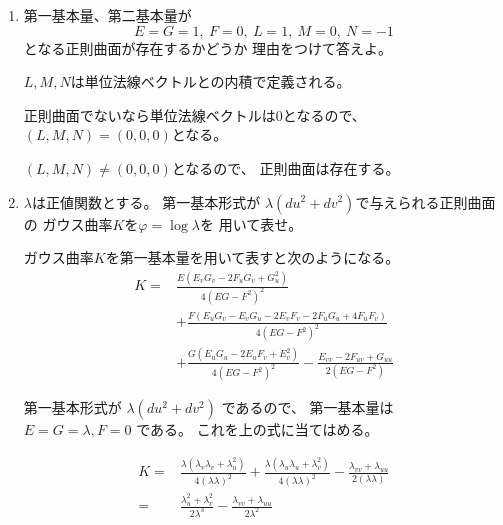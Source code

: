 \documentclass[12pt,b5paper]{ltjsarticle}
\begin{document}
\begin{enumerate}
 \item
      第一基本量、第二基本量が
      \begin{equation}
       E=G=1,\
        F=0,\
        L=1,\
        M=0,\
        N=-1
      \end{equation}
      となる正則曲面が存在するかどうか
      理由をつけて答えよ。

      \dotfill

      $L,M,N$は単位法線ベクトルとの内積で定義される。

      正則曲面でないなら単位法線ベクトルは0となるので、
      $(L,M,N)=(0,0,0)$となる。

      $(L,M,N)\ne(0,0,0)$となるので、
      正則曲面は存在する。


      \hrulefill

 \item
      $\lambda$は正値関数とする。
      第一基本形式が
      $\lambda(du^2+dv^2)$で与えられる正則曲面の
      ガウス曲率$K$を$\varphi = \log{\lambda}$を
      用いて表せ。

      \dotfill

      ガウス曲率$K$を第一基本量を用いて表すと次のようになる。
      \begin{equation}
        \begin{split}
         K =&
         \frac{E  (E_{v}G_{v} - 2F_{u}G_{v} + G_{u}^{2})}
             {4(E G - F^{2})^{2}}\\
         & + \frac{F (E_{u}G_{v} - E_{v}G_{u} - 2E_{v}F_{v} - 2F_{u}G_{u} + 4F_{u}F_{v})}
             {4(E G - F^{2})^{2}}\\
         & + \frac{G (E_{u}G_{u} - 2E_{u}F_{v} + E_{v}^{2})}
             {4(EG - F^{2})^{2}}
         - \frac{E_{vv} - 2F_{uv} + G_{uu}}{2(EG-F^2)}
        \end{split}
      \end{equation}

      第一基本形式が
      $\lambda(du^2+dv^2)$
      であるので、
      第一基本量は
      $E=G=\lambda,F=0$
      である。
      これを上の式に当てはめる。

      \begin{align}
       K =&
         \frac{\lambda  (\lambda_{v}\lambda_{v} + \lambda_{u}^{2})}
             {4(\lambda \lambda )^{2}}
          + \frac{\lambda (\lambda_{u}\lambda_{u} + \lambda_{v}^{2})}
             {4(\lambda \lambda )^{2}}
         - \frac{\lambda_{vv} + \lambda_{uu}}{2(\lambda \lambda)}\\
       =&
          \frac{\lambda_{u}^2 + \lambda_{v}^{2}}{2\lambda^{3}}
         - \frac{\lambda_{vv} + \lambda_{uu}}{2\lambda^2}
      \end{align}



\end{enumerate}
\end{document}
